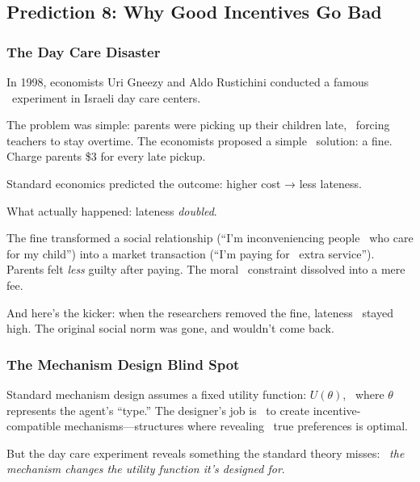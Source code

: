 \subsection{Prediction 8: Why Good Incentives Go Bad}
\label{subsec:pred8-mechanism}


\subsubsection{The Day Care Disaster}

In 1998, economists Uri Gneezy and Aldo Rustichini conducted a famous \
experiment in Israeli day care centers.

The problem was simple: parents were picking up their children late, \
forcing teachers to stay overtime. The economists proposed a simple \
solution: a fine. Charge parents \$3 for every late pickup.

Standard economics predicted the outcome: higher cost → less lateness.

What actually happened: lateness \emph{doubled}.

The fine transformed a social relationship (``I'm inconveniencing people \
who care for my child'') into a market transaction (``I'm paying for \
extra service''). Parents felt \emph{less} guilty after paying. The moral \
constraint dissolved into a mere fee.

And here's the kicker: when the researchers removed the fine, lateness \
stayed high. The original social norm was gone, and wouldn't come back.

\subsubsection{The Mechanism Design Blind Spot}

Standard mechanism design assumes a fixed utility function: $U(\theta)$, \
where $\theta$ represents the agent's ``type.'' The designer's job is \
to create incentive-compatible mechanisms---structures where revealing \
true preferences is optimal.

But the day care experiment reveals something the standard theory misses: \
\emph{the mechanism changes the utility function it's designed for}.

